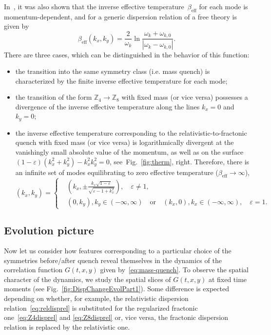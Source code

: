 \documentclass[a4paper,12pt]{article}
\newcommand{\be}{\begin{equation}}
\newcommand{\ee}{\end{equation}}
\newcommand{\eps}{\varepsilon}
\newcommand{\om}{\omega}
\newcommand{\Z}[1]{\mathbb{Z}_{#1}}
\newcommand{\figref}[1]{Fig.~\ref{#1}}
\begin{document}
In~\cite{Calabrese:2007rg}, it was also shown that the inverse effective temperature~$\beta_\text{eff}$ for each mode is momentum-dependent, and for a generic dispersion relation of a free theory is given by
\be
    \beta_\text{eff}(k_x, k_y) = \frac{2}{\om_k}\ln\frac{\om_k + \om_{k,0}}{|\om_k - \om_{k,0}|}.
    \label{eq:EffTemp}
\ee
There are three cases, which can be distinguished in the behavior of this function:
\begin{itemize}
    \item the transition into the same symmetry class (i.e. mass quench) is characterized by the finite inverse effective temperature for each mode;
    
    \item the transition of the form $\Z4 \to \Z8$ with fixed mass (or vice versa) possesses a divergence of the inverse effective temperature along the lines $k_x = 0$ and $k_y = 0$;
    
    \item the inverse effective temperature corresponding to the relativistic-to-fractonic quench with fixed mass (or vice versa) is logarithmically divergent at the vanishingly small absolute value of the momentum, as well as on the surface $(1 - \eps)(k_x^2 + k_y^2) - k_x^2k_y^2 = 0$, see~\figref{fig:therm}, right. Therefore, there is an infinite set of modes equilibrating to zero effective temperature ($\beta_\text{eff} \to \infty$),
        \be
            (k_x, k_y) = \left\{
            \begin{aligned}
                & \left(k_x, \pm\frac{k_x\sqrt{1 - \eps}}{\sqrt{\eps - 1 + k_x^2}}\right), \quad \eps \neq 1, \\
                & \left(0, k_y\right), k_y \in (-\infty, \infty) \quad\text{or}\quad \left(k_x, 0\right), k_x \in (-\infty, \infty), \quad \eps = 1.
            \end{aligned}\right.
        \ee
\end{itemize}

\subsection*{Evolution picture}

Now let us consider how features corresponding to a particular choice of the symmetries before/after quench reveal themselves in the dynamics of the correlation function $G(t, x, y)$ given by~\eqref{eq:mass-quench}. To observe the spatial character of the dynamics, we study the spatial slices of $G(t, x, y)$ at fixed time moments (see \figref{fig:DispChangeEvolPart1}). Some difference is expected depending on whether, for example, the relativistic dispersion relation~\eqref{eq:reldisprel} is substituted for the regularized fractonic one~\eqref{eq:Z4disprel} and \eqref{eq:Z8disprel} or, vice versa, the fractonic dispersion relation is replaced by the relativistic one.
\end{document}
